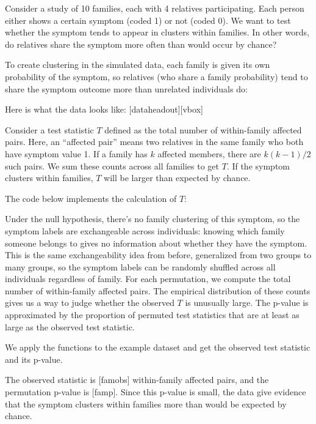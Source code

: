 \begin{example}

Consider a study of 10 families, each with 4 relatives participating.
Each person either shows a certain symptom (coded 1) or not (coded 0).
We want to test whether the symptom tends to appear in clusters within
families. In other words, do relatives share the symptom more often
than would occur by chance?

To create clustering in the simulated data, each family is given its
own probability of the symptom, so relatives (who share a family
probability) tend to share the symptom outcome more than unrelated
individuals do:

Here is what the data looks like:
[dataheadout][vbox]

Consider a test statistic $T$ defined as the total number of 
within-family affected pairs. Here, an ``affected pair'' means two 
relatives in the same family who both have symptom value 1. If a 
family has $k$ affected members, there are $k(k-1)/2$ such pairs. We 
sum these counts across all families to get $T$. If the symptom 
clusters within families, $T$ will be larger than expected by chance.

The code below implements the calculation of $T$:


Under the null hypothesis, there's no family clustering of this
symptom, so the symptom labels are exchangeable across individuals:
knowing which family someone belongs to gives no information about
whether they have the symptom. This is the same exchangeability idea
from before, generalized from two groups to many groups, so the symptom
labels can be randomly shuffled across all individuals regardless of
family. For each permutation, we compute the total
number of within-family affected pairs. The empirical distribution of
these counts gives us a way to judge whether the observed $T$ is
unusually large. The p-value is approximated by the proportion of
permuted test statistics that are at least as large as the observed
test statistic.



We apply the functions to the example dataset and get the observed test
statistic and its p-value.


The observed statistic is
[famobs] within-family affected
pairs, and the permutation p-value is
[famp]. Since this p-value is small,
the data give evidence that the symptom clusters within families more
than would be expected by chance.
\end{example}


